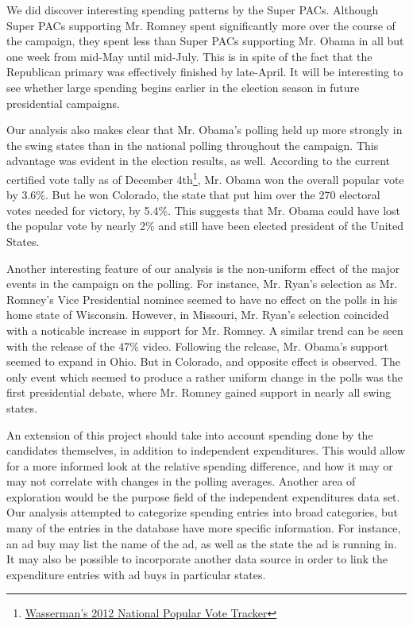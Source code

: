 \documentclass[11pt]{article}\usepackage{graphicx, color}
\begin{document}
We did discover interesting spending patterns by the Super PACs. Although Super PACs supporting Mr. Romney spent significantly more over the course of the campaign, they spent less than Super PACs supporting Mr. Obama in all but one week from mid-May until mid-July. This is in spite of the fact that the Republican primary was effectively finished by late-April. It will be interesting to see whether large spending begins earlier in the election season in future presidential campaigns.

Our analysis also makes clear that Mr. Obama's polling held up more strongly in the swing states than in the national polling throughout the campaign. This advantage was evident in the election results, as well. According to the current certified vote tally as of December 4th\footnote{\href{https://docs.google.com/spreadsheet/lv?key=0AjYj9mXElO_QdHpla01oWE1jOFZRbnhJZkZpVFNKeVE&toomany=true}{Wasserman's 2012 National Popular Vote Tracker}}, Mr. Obama won the overall popular vote by 3.6\%. But he won Colorado, the state that put him over the 270 electoral votes needed for victory, by 5.4\%. This suggests that Mr. Obama could have lost the popular vote by nearly 2\% and still have been elected president of the United States.

Another interesting feature of our analysis is the non-uniform effect of the major events in the campaign on the polling. For instance, Mr. Ryan's selection as Mr. Romney's Vice Presidential nominee seemed to have no effect on the polls in his home state of Wisconsin. However, in Missouri, Mr. Ryan's selection coincided with a noticable increase in support for Mr. Romney. A similar trend can be seen with the release of the 47\% video. Following the release, Mr. Obama's support seemed to expand in Ohio. But in Colorado, and opposite effect is observed. The only event which seemed to produce a rather uniform change in the polls was the first presidential debate, where Mr. Romney gained support in nearly all swing states.

An extension of this project should take into account spending done by the candidates themselves, in addition to independent expenditures. This would allow for a more informed look at the relative spending difference, and how it may or may not correlate with changes in the polling averages. Another area of exploration would be the purpose field of the independent expenditures data set. Our analysis attempted to categorize spending entries into broad categories, but many of the entries in the database have more specific information. For instance, an ad buy may list the name of the ad, as well as the state the ad is running in. It may also be possible to incorporate another data source in order to link the expenditure entries with ad buys in particular states.
\end{document}
